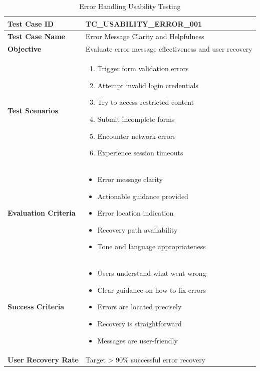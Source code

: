 \documentclass[12pt,a4paper]{article}
\begin{document}
\begin{longtable}{|p{3cm}|p{12cm}|}
\caption{Error Handling Usability Testing} \\
\hline
\rowcolor{lightgray}
\textbf{Test Case ID} & \textbf{TC\_USABILITY\_ERROR\_001} \\
\hline
\textbf{Test Case Name} & Error Message Clarity and Helpfulness \\
\hline
\textbf{Objective} & Evaluate error message effectiveness and user recovery \\
\hline
\textbf{Test Scenarios} & 
\begin{enumerate}[nosep]
    \item Trigger form validation errors
    \item Attempt invalid login credentials
    \item Try to access restricted content
    \item Submit incomplete forms
    \item Encounter network errors
    \item Experience session timeouts
\end{enumerate} \\
\hline
\textbf{Evaluation Criteria} & 
\begin{itemize}[nosep]
    \item Error message clarity
    \item Actionable guidance provided
    \item Error location indication
    \item Recovery path availability
    \item Tone and language appropriateness
\end{itemize} \\
\hline
\textbf{Success Criteria} & 
\begin{itemize}[nosep]
    \item Users understand what went wrong
    \item Clear guidance on how to fix errors
    \item Errors are located precisely
    \item Recovery is straightforward
    \item Messages are user-friendly
\end{itemize} \\
\hline
\textbf{User Recovery Rate} & Target > 90\% successful error recovery \\
\hline
\end{longtable}
\end{document}
